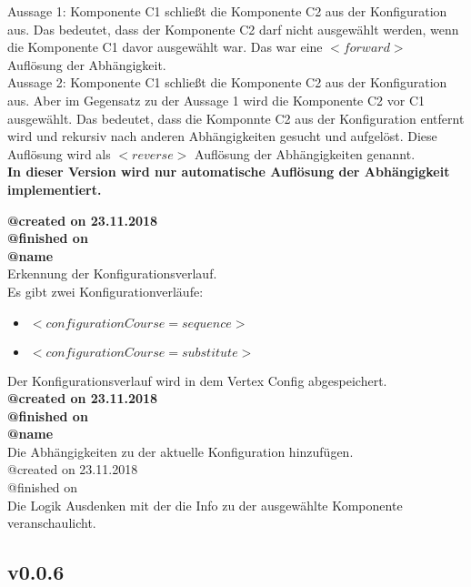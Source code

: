 \documentclass{article}
\begin{document}
Aussage 1: Komponente C1 schließt die Komponente C2 aus der Konfiguration aus. Das bedeutet, dass
der Komponente C2 darf nicht ausgewählt werden, wenn die Komponente C1 davor ausgewählt war. Das war 
eine $<forward>$ Auflösung der Abhängigkeit.\\

Aussage 2: Komponente C1 schließt die Komponente C2 aus der Konfiguration aus. 
Aber im Gegensatz zu der Aussage 1 wird die Komponente C2 vor C1 ausgewählt. Das bedeutet, 
dass die Komponnte C2 aus der Konfiguration entfernt wird und rekursiv nach 
anderen Abhängigkeiten gesucht und aufgelöst. Diese Auflösung wird als $<reverse>$ Auflösung 
der Abhängigkeiten genannt.\\

\textbf{In dieser Version wird nur automatische Auflösung der Abhängigkeit implementiert.}

\noindent\textbf{@created on 23.11.2018}\\
\textbf{@finished on }\\
\textbf{@name }\\

\noindent Erkennung der Konfigurationsverlauf.\\
Es gibt zwei Konfigurationverläufe: 

\begin{itemize}
	\item $<configurationCourse=sequence>$
	\item $<configurationCourse=substitute>$
\end{itemize}
\noindent Der Konfigurationsverlauf wird in dem Vertex Config abgespeichert. \\

\noindent \textbf{@created on 23.11.2018}\\
\textbf{@finished on }\\
\textbf{@name}\\

\noindent Die Abhängigkeiten zu der aktuelle Konfiguration hinzufügen.\\

\noindent @created on 23.11.2018\\
@finished on \\
Die Logik Ausdenken mit der die Info zu der ausgewählte Komponente veranschaulicht.\\

\subsection{v0.0.6}
\end{document}
